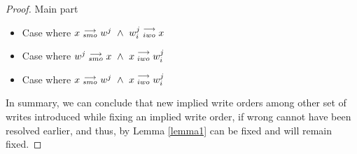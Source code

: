 \begin{proof}{Main part}
\begin{itemize}
\begin{itemize}
                            \item Case where $x\stackrel{\longrightarrow}{_{smo}}w^j \ \wedge \ w_i^j\stackrel{\longrightarrow}{_{iwo}}x$

                            \item Case where $w^j\stackrel{\longrightarrow}{_{smo}}x \ \wedge \ x\stackrel{\longrightarrow}{_{iwo}}w_i^j$

                            \item Case where $x\stackrel{\longrightarrow}{_{smo}}w^j \ \wedge \ x\stackrel{\longrightarrow}{_{iwo}}w_i^j$

                        \end{itemize}
                \end{itemize}

                In summary, we can conclude that new implied write orders among other set of writes introduced while fixing an implied write order, if wrong cannot have been resolved earlier, and thus, by Lemma \ref{lemma1} can be fixed and will remain fixed.

        \end{proof}
